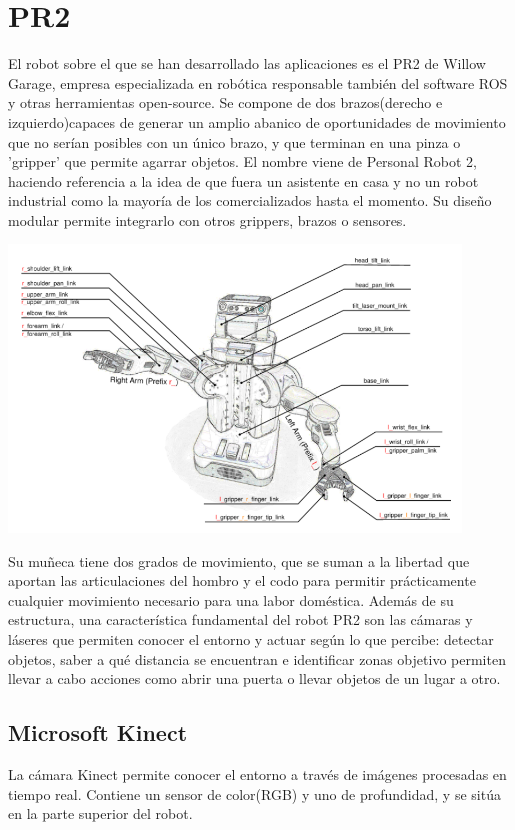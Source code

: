 \documentclass[12pt,spanish,chapterprefix, numbers=noenddot]{book}
\numberwithin{equation}{section}
\numberwithin{figure}{section}
\begin{document}
\section{PR2}
El robot sobre el que se han desarrollado las aplicaciones es el PR2 de Willow Garage, empresa especializada en robótica responsable también del software ROS y otras herramientas open-source. Se compone de dos brazos(derecho e izquierdo)capaces de generar un amplio abanico de oportunidades de movimiento que no serían posibles con un único brazo, y que terminan en una pinza o 'gripper' que permite agarrar objetos. El nombre viene de Personal Robot 2, haciendo referencia a la idea de que fuera un asistente en casa y no un robot industrial como la mayoría de los comercializados hasta el momento.
Su diseño modular permite integrarlo con otros grippers, brazos o sensores.
\begin{center}
\includegraphics[width=12cm]{Figs/PR2_structure.png}
\end{center}
Su muñeca tiene dos grados de movimiento, que se suman a la libertad que aportan las articulaciones del hombro y el codo para permitir prácticamente cualquier movimiento necesario para una labor doméstica.
Además de su estructura, una característica fundamental del robot PR2 son las cámaras y láseres que permiten conocer el entorno y actuar según lo que percibe: detectar objetos, saber a qué distancia se encuentran e identificar zonas objetivo permiten llevar a cabo acciones como abrir una puerta o llevar objetos de un lugar a otro.
\subsection{Microsoft Kinect}
La cámara Kinect permite conocer el entorno a través de imágenes procesadas en tiempo real. 
Contiene un sensor de color(RGB) y uno de profundidad, y se sitúa en la parte superior del robot. 
\end{document}
